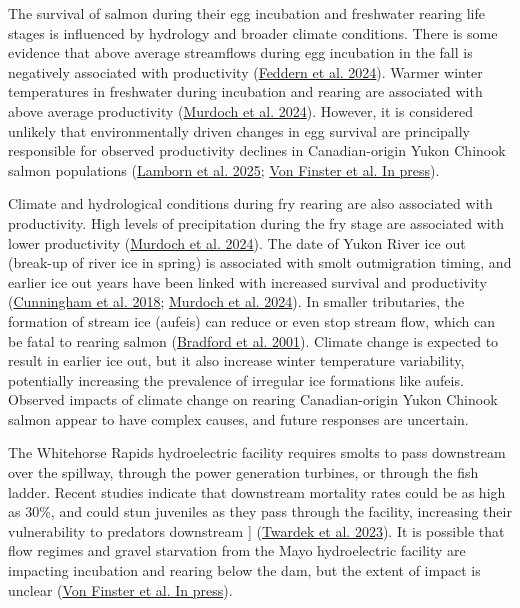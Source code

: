 \documentclass[11pt]{book}
\begin{document}
The survival of salmon during their egg incubation and freshwater rearing life stages is influenced by hydrology and broader climate conditions. There is some evidence that above average streamflows during egg incubation in the fall is negatively associated with productivity (\protect\hyperlink{ref-feddern2024}{Feddern et al. 2024}). Warmer winter temperatures in freshwater during incubation and rearing are associated with above average productivity (\protect\hyperlink{ref-murdoch2024}{Murdoch et al. 2024}). However, it is considered unlikely that environmentally driven changes in egg survival are principally responsible for observed productivity declines in Canadian-origin Yukon Chinook salmon populations (\protect\hyperlink{ref-lamborn2025}{Lamborn et al. 2025}; \protect\hyperlink{ref-vonfinster}{Von Finster et al. In press}).

Climate and hydrological conditions during fry rearing are also associated with productivity. High levels of precipitation during the fry stage are associated with lower productivity (\protect\hyperlink{ref-murdoch2024}{Murdoch et al. 2024}). The date of Yukon River ice out (break-up of river ice in spring) is associated with smolt outmigration timing, and earlier ice out years have been linked with increased survival and productivity (\protect\hyperlink{ref-cunningham2018}{Cunningham et al. 2018}; \protect\hyperlink{ref-murdoch2024}{Murdoch et al. 2024}). In smaller tributaries, the formation of stream ice (aufeis) can reduce or even stop stream flow, which can be fatal to rearing salmon (\protect\hyperlink{ref-bradford2001}{Bradford et al. 2001}). Climate change is expected to result in earlier ice out, but it also increase winter temperature variability, potentially increasing the prevalence of irregular ice formations like aufeis. Observed impacts of climate change on rearing Canadian-origin Yukon Chinook salmon appear to have complex causes, and future responses are uncertain.

The Whitehorse Rapids hydroelectric facility requires smolts to pass downstream over the spillway, through the power generation turbines, or through the fish ladder. Recent studies indicate that downstream mortality rates could be as high as 30\%, and could stun juveniles as they pass through the facility, increasing their vulnerability to predators downstream {]} (\protect\hyperlink{ref-twardek2023}{Twardek et al. 2023}). It is possible that flow regimes and gravel starvation from the Mayo hydroelectric facility are impacting incubation and rearing below the dam, but the extent of impact is unclear (\protect\hyperlink{ref-vonfinster}{Von Finster et al. In press}).
\end{document}
